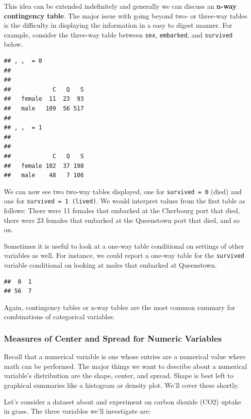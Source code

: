 \documentclass[
]{book}
\theoremstyle{definition}
\theoremstyle{definition}
\theoremstyle{definition}
\theoremstyle{remark}
\begin{document}
This idea can be extended indefinitely and generally we can discuss an \textbf{n-way contingency table}. The major issue with going beyond two- or three-way tables is the difficulty in displaying the information in a easy to digest manner. For example, consider the three-way table between \texttt{sex}, \texttt{embarked}, and \texttt{survived} below.

\begin{verbatim}
## , ,  = 0
## 
##         
##            C   Q   S
##   female  11  23  93
##   male   109  56 517
## 
## , ,  = 1
## 
##         
##            C   Q   S
##   female 102  37 198
##   male    48   7 106
\end{verbatim}

We can now see two two-way tables displayed, one for \texttt{survived\ =\ 0} (died) and one for \texttt{survived\ =\ 1\ (lived)}. We would interpret values from the first table as follows: There were 11 females that embarked at the Cherbourg port that died, there were 23 females that embarked at the Queenstown port that died, and so on.

Sometimes it is useful to look at a one-way table conditional on settings of other variables as well. For instance, we could report a one-way table for the \texttt{survived} variable conditional on looking at males that embarked at Queenstown.

\begin{verbatim}
##  0  1 
## 56  7
\end{verbatim}

Again, contingency tables or n-way tables are the most common summary for combinations of categorical variables.

\hypertarget{measures-of-center-and-spread-for-numeric-variables}{%
\subsubsection{Measures of Center and Spread for Numeric Variables}\label{measures-of-center-and-spread-for-numeric-variables}}

Recall that a numerical variable is one whose entries are a numerical value where math can be performed. The major things we want to describe about a numerical variable's distribution are the shape, center, and spread. Shape is best left to graphical summaries like a histogram or density plot. We'll cover these shortly.

Let's consider a dataset about and experiment on carbon dioxide (CO2) uptake in grass. The three variables we'll investigate are:
\end{document}
